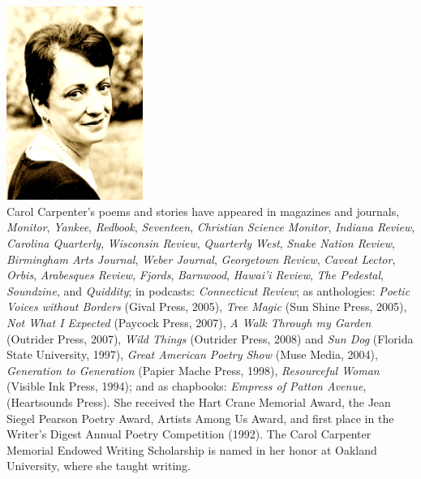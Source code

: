 \documentclass[openleft,10pt]{article}
\begin{document}
\noindent%
\begin{minipage}[t][9.861in][t]{6.625in}
  \noindent
  \centering
  \mbox{ } \hfill
  \hspace{0.5in}
  \begin{minipage}{4.5in}
    \includegraphics[width=1.75in]{img/carol-contrast.png}
    \mbox{ }\hfill{}
    \\[4pt]
    Carol Carpenter's poems and stories have appeared in magazines and
    journals,  \emph{Monitor}, \emph{Yankee}, 
    \emph{Redbook}, \emph{Seventeen}, \emph{Christian Science
      Monitor}, \emph{Indiana Review}, \emph{Carolina Quarterly},
    \emph{Wisconsin Review}, \emph{Quarterly West}, \emph{Snake Nation
      Review}, \emph{Birmingham Arts Journal}, \emph{Weber Journal},
    \emph{Georgetown Review}, \emph{Caveat Lector}, \emph{Orbis},
    \emph{Arabesques Review}, \emph{Fjords}, \emph{Barnwood},
    \emph{Hawai'i Review}, \emph{The Pedestal}, \emph{Soundzine}, and
    \emph{Quiddity}; in podcasts: \emph{Connecticut Review}; as anthologies:
    \emph{Poetic Voices without Borders} (Gival Press,
    2005), \emph{Tree Magic} (Sun Shine Press, 2005), \emph{Not What I
      Expected} (Paycock Press, 2007), \emph{A Walk Through my Garden}
    (Outrider Press, 2007), \emph{Wild Things} (Outrider Press, 2008)
    and \emph{Sun Dog} (Florida State University, 1997), \emph{Great
      American Poetry Show} (Muse Media, 2004), \emph{Generation to
      Generation} (Papier Mache Press, 1998), \emph{Resourceful Woman}
    (Visible Ink Press, 1994); and as chapbooks: \emph{Empress of
      Patton Avenue}, (Heartsounds Press). She received 
    the Hart Crane Memorial Award, the Jean Siegel Pearson Poetry
    Award, Artists Among Us Award, and first place in the Writer's
    Digest Annual Poetry Competition (1992).  The Carol Carpenter
    Memorial Endowed Writing Scholarship is named in her honor at
    Oakland University, where she taught writing.
\end{minipage}%
\hfill\mbox{ }\hspace*{0.25in}
\end{minipage}%
\end{document}
